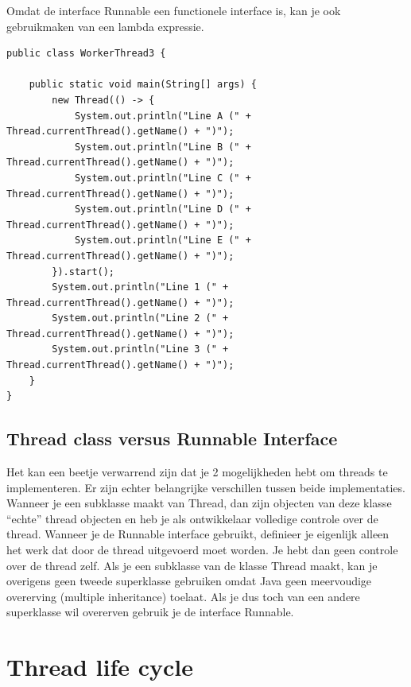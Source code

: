 \documentclass{tstextbook}
\begin{document}
Omdat de interface Runnable een functionele interface is, kan je ook gebruikmaken van een lambda expressie.

\begin{lstlisting}
public class WorkerThread3 {

	public static void main(String[] args) {
		new Thread(() -> {
			System.out.println("Line A (" + Thread.currentThread().getName() + ")");
			System.out.println("Line B (" + Thread.currentThread().getName() + ")");
			System.out.println("Line C (" + Thread.currentThread().getName() + ")");
			System.out.println("Line D (" + Thread.currentThread().getName() + ")");
			System.out.println("Line E (" + Thread.currentThread().getName() + ")");
		}).start();
		System.out.println("Line 1 (" + Thread.currentThread().getName() + ")");
		System.out.println("Line 2 (" + Thread.currentThread().getName() + ")");
		System.out.println("Line 3 (" + Thread.currentThread().getName() + ")");
	}
}
\end{lstlisting}


\subsection{Thread class versus Runnable Interface}

Het kan een beetje verwarrend zijn dat je 2 mogelijkheden hebt om threads te implementeren. Er zijn echter belangrijke verschillen tussen beide implementaties. Wanneer je een subklasse maakt van Thread, dan zijn objecten van deze klasse ``echte'' thread objecten en heb je als ontwikkelaar volledige controle over de thread. Wanneer je de Runnable interface gebruikt, definieer je eigenlijk alleen het werk dat door de thread uitgevoerd moet worden. Je hebt dan geen controle over de thread zelf. 
Als je een subklasse van de klasse Thread maakt, kan je overigens geen tweede superklasse gebruiken omdat Java geen meervoudige overerving (multiple inheritance) toelaat. Als je dus toch van een andere superklasse wil overerven gebruik je de interface Runnable.

\section{Thread life cycle}
\end{document}
